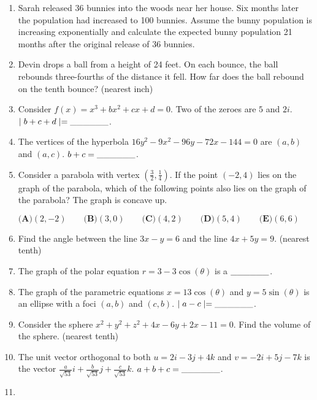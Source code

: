 \documentclass[../uilmath.tex]{subfiles}
\begin{document}
\begin{enumerate}[label=\bfseries\arabic*.]
    \item %
    Sarah released 36 bunnies into the woods near her house. Six months later the population had increased to 
    100 bunnies. Assume the bunny population is increasing exponentially and calculate the expected bunny population 21 months after the original release of 36 bunnies.

    \item %
    Devin drops a ball from a height of 24 feet. On each bounce, the ball rebounds three-fourths of the distance it fell. How far does the ball rebound on the tenth bounce? (nearest inch)

    \item %
    Consider $f(x)=x^3+bx^2+cx+d=0$. Two of the zeroes are $5$ and $2i$. $\mid b+c+d \mid=\_\_\_\_\_\_$.

    \item %
    The vertices of the hyperbola $16y^2-9x^2-96y-72x-144=0$ are $(a,b)$ and $(a,c)$. $b+c=\_\_\_\_\_\_$.

    \item %
    Consider a parabola with vertex $\left(\frac{3}{2},\frac{1}{4}\right)$. If the point 
    $(-2,4)$ lies on the graph of the parabola, which of the following points also lies on the graph of the parabola? The graph is concave up.

    $\textbf{(A)} (2,-2) \qquad \textbf{(B)} (3,0) \qquad \textbf{(C)} (4,2) \qquad \textbf{(D)} (5,4) \qquad \textbf{(E)} (6,6)$

    \item %
    Find the angle between the line $3x-y=6$ and the line $4x+5y=9$. (nearest tenth)

    \item %
    The graph of the polar equation $r=3-3\cos(\theta)$ is a $\_\_\_\_\_\_$.

    \item %
    The graph of the parametric equations $x=13\cos(\theta)$ and $y=5\sin(\theta)$ is an ellipse with a foci $(a,b)$ and $(c,b)$. $\mid a-c \mid = \_\_\_\_\_\_$.

    \item %
    Consider the sphere $x^2+y^2+z^2+4x-6y+2x-11=0$. Find the volume of the sphere. (nearest tenth)

    \item %
    The unit vector orthogonal to both $u=2i-3j+4k$ and $v=-2i+5j-7k$ is the vector 
    $\frac{a}{\sqrt{53}}i+\frac{b}{\sqrt{53}}j+\frac{c}{\sqrt{53}}k$. $a+b+c=\_\_\_\_\_\_$.

    \item %
    

\end{enumerate}
\end{document}
